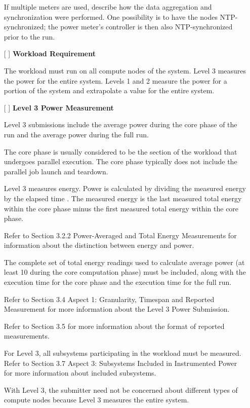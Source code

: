 \begin{itemize}
If multiple meters are used, describe how the data aggregation and synchronization were performed. One possibility is to have the nodes NTP-synchronized; the power meter's controller is then also NTP-synchronized prior to the run.

\item[{[ ]}]
\textbf{Workload Requirement}

The workload must run on all compute nodes of the system. Level 3 measures the power for the entire system. Levels 1 and 2 measure the power for a portion of the system and extrapolate a value for the entire system. 

\item[{[ ]}]
\textbf{Level 3 Power Measurement}

Level 3 submissions include the average power during the core phase of the run and the average power during the full run.

The core phase is usually considered to be the section of the workload that undergoes parallel execution. The core phase typically does not include the parallel job launch and teardown.

Level 3 measures energy. Power is calculated by dividing the measured energy by the elapsed time . The measured energy is the last measured total energy within the core phase minus the first measured total energy within the core phase.

Refer to Section 3.2.2 Power-Averaged and Total Energy Measurements for information about the distinction between energy and power.

The complete set of total energy readings used to calculate average power (at least 10 during the core computation phase) must be included, along with the execution time for the core phase and the execution time for the full run.

Refer to Section 3.4 Aspect 1: Granularity, Timespan and Reported Measurement for more information about the Level 3 Power Submission.

Refer to Section 3.5 for more information about the format of reported measurements.

For Level 3, all subsystems participating in the workload must be measured. Refer to Section 3.7 Aspect 3: Subsystems Included in Instrumented Power for more information about included subsystems.

With Level 3, the submitter need not be concerned about different types of compute nodes because Level 3 measures the entire system.


\end{itemize}
